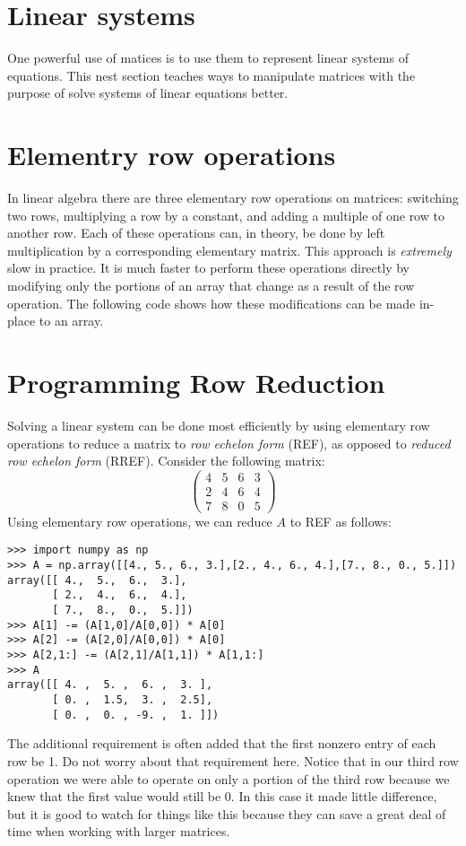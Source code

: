 \section*{Linear systems}
One powerful use of matices is to use them to represent linear systems of equations. This nest section teaches ways to manipulate matrices with the purpose of solve systems of linear equations better. 

\section*{Elementry row operations}
In linear algebra there are three elementary row operations on matrices: switching two rows, multiplying a row by a constant, and adding a multiple of one row to another row.
Each of these operations can, in theory, be done by left multiplication by a corresponding elementary matrix.
This approach is \emph{extremely} slow in practice.
It is much faster to perform these operations directly by modifying only the portions of an array that change as a result of the row operation.
The following code shows how these modifications can be made in-place to an array.


\section*{Programming Row Reduction}
Solving a linear system can be done most efficiently by using elementary row operations to reduce a matrix to \emph{row echelon form} (REF), as opposed to \emph{reduced row echelon form} (RREF).
Consider the following matrix:
\[
\begin{pmatrix}
4&5&6&3 \\
2&4&6&4 \\
7&8&0&5
\end{pmatrix}
\]
Using elementary row operations, we can reduce $A$ to REF as follows:
\begin{lstlisting}
>>> import numpy as np
>>> A = np.array([[4., 5., 6., 3.],[2., 4., 6., 4.],[7., 8., 0., 5.]])
array([[ 4.,  5.,  6.,  3.],
       [ 2.,  4.,  6.,  4.],
       [ 7.,  8.,  0.,  5.]])
>>> A[1] -= (A[1,0]/A[0,0]) * A[0]
>>> A[2] -= (A[2,0]/A[0,0]) * A[0]
>>> A[2,1:] -= (A[2,1]/A[1,1]) * A[1,1:]
>>> A
array([[ 4. ,  5. ,  6. ,  3. ],
       [ 0. ,  1.5,  3. ,  2.5],
       [ 0. ,  0. , -9. ,  1. ]])
\end{lstlisting}
The additional requirement is often added that the first nonzero entry of each row be 1.
Do not worry about that requirement here.
Notice that in our third row operation we were able to operate on only a portion of the third row because we knew that the first value would still be 0.
In this case it made little difference, but it is good to watch for things like this because they can save a great deal of time when working with larger matrices.

